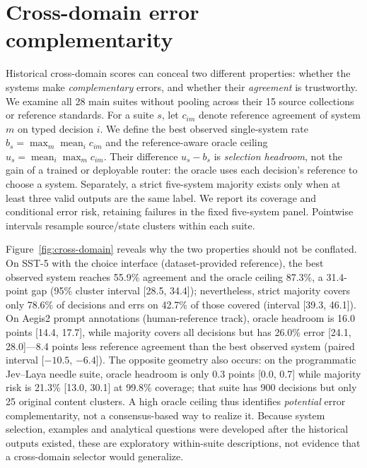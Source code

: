 \section{Cross-domain error complementarity}
\label{sec:cross-domain}
Historical cross-domain scores can conceal two different properties: whether the systems make \emph{complementary} errors, and whether their \emph{agreement} is trustworthy. We examine all 28 main suites without pooling across their 15 source collections or reference standards. For a suite $s$, let $c_{im}$ denote reference agreement of system $m$ on typed decision $i$. We define the best observed single-system rate $b_s=\max_m\operatorname{mean}_i c_{im}$ and the reference-aware oracle ceiling $u_s=\operatorname{mean}_i\max_m c_{im}$. Their difference $u_s-b_s$ is \emph{selection headroom}, not the gain of a trained or deployable router: the oracle uses each decision's reference to choose a system. Separately, a strict five-system majority exists only when at least three valid outputs are the same label. We report its coverage and conditional error risk, retaining failures in the fixed five-system panel. Pointwise intervals resample source/state clusters within each suite.

Figure~\ref{fig:cross-domain} reveals why the two properties should not be conflated. On SST-5 with the choice interface (dataset-provided reference), the best observed system reaches 55.9\% agreement and the oracle ceiling 87.3\%, a 31.4-point gap (95\% cluster interval [28.5, 34.4]); nevertheless, strict majority covers only 78.6\% of decisions and errs on 42.7\% of those covered (interval [39.3, 46.1]). On Aegis2 prompt annotations (human-reference track), oracle headroom is 16.0 points [14.4, 17.7], while majority covers all decisions but has 26.0\% error [24.1, 28.0]---8.4 points less reference agreement than the best observed system (paired interval [$-10.5$, $-6.4$]). The opposite geometry also occurs: on the programmatic Jev--Laya needle suite, oracle headroom is only 0.3 points [0.0, 0.7] while majority risk is 21.3\% [13.0, 30.1] at 99.8\% coverage; that suite has 900 decisions but only 25 original content clusters. A high oracle ceiling thus identifies \emph{potential} error complementarity, not a consensus-based way to realize it. Because system selection, examples and analytical questions were developed after the historical outputs existed, these are exploratory within-suite descriptions, not evidence that a cross-domain selector would generalize.

